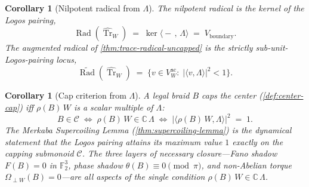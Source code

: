 \documentclass[11pt,a4paper]{article}
\theoremstyle{plain}
\newtheorem{corollary}[theorem]{Corollary}
\theoremstyle{definition}
\theoremstyle{remark}
\numberwithin{equation}{section}
\newcommand{\Complex}{\mathbb{C}}
\newcommand{\F}{\mathbb{F}}
\DeclareMathOperator{\Tr}{Tr}
\DeclareMathOperator{\Rad}{Rad}
\begin{document}
\begin{corollary}[Nilpotent radical from $\Lambda$]
\label{cor:radical-from-logos}
The nilpotent radical is the kernel of the Logos pairing,
\[
  \Rad(\widehat{\Tr}_W)
  \;=\;\ker\bigl\langle-\,,\,\Lambda\bigr\rangle
  \;=\;V_{\mathrm{boundary}}.
\]
The augmented radical of \cref{thm:trace-radical-uncapped} is
the strictly sub-unit-Logos-pairing locus,
\[
  \widetilde{\Rad}(\widehat{\Tr}_W)
  \;=\;\bigl\{v\in V_W^{\mathrm{ac}}:
        \;|\langle v,\Lambda\rangle|^2<1\bigr\}.
\]
\end{corollary}

\begin{corollary}[Cap criterion from $\Lambda$]
\label{cor:cap-from-logos}
A legal braid $B$ caps the center (\cref{def:center-cap}) iff
$\rho(B)\,W$ is a scalar multiple of $\Lambda$:
\[
  B\in\mathcal{C}
  \;\Longleftrightarrow\;
  \rho(B)\,W\in\Complex\,\Lambda
  \;\Longleftrightarrow\;
  \bigl|\langle\rho(B)\,W,\Lambda\rangle\bigr|^2\;=\;1.
\]
The Merkaba Supercoiling Lemma
(\cref{thm:supercoiling-lemma}) is the dynamical statement that
the Logos pairing attains its maximum value $1$ exactly on the
capping submonoid $\mathcal{C}$.  The three layers of necessary
closure---Fano shadow $F(B)=0$ in $\F_2^3$, phase shadow
$\theta(B)\equiv 0\pmod\pi$, and non-Abelian torque
$\Omega_{\perp W}(B)=0$---are all aspects of the single condition
$\rho(B)\,W\in\Complex\,\Lambda$.
\end{corollary}
\end{document}

